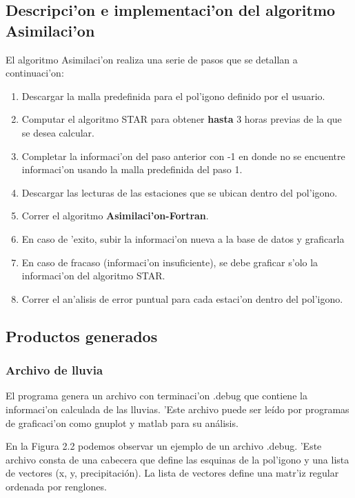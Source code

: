 \subsection{Descripci'on e implementaci'on del algoritmo Asimilaci'on}
El algoritmo Asimilaci'on realiza una serie de pasos que se detallan a continuaci'on:
\begin{enumerate}
 \item Descargar la malla predefinida para el pol'igono definido por el usuario.
  \item Computar el algoritmo STAR para obtener \textbf{hasta} 3 horas previas de la que se desea calcular.
  \item Completar la informaci'on del paso anterior con -1 en donde no se encuentre informaci'on usando la malla predefinida del paso 1.
  \item Descargar las lecturas de las estaciones que se ubican dentro del pol'igono.
  \item Correr el algoritmo \textbf{Asimilaci'on-Fortran}.
  \item En caso de 'exito, subir la informaci'on nueva a la base de datos y graficarla
  \item En caso de fracaso (informaci'on insuficiente), se debe graficar s'olo la informaci'on del algoritmo STAR.
  \item Correr el an'alisis de error puntual para cada estaci'on dentro del pol'igono.
\end{enumerate}

\subsection{Productos generados}
\subsubsection*{Archivo de lluvia}
El programa genera un archivo con terminaci'on .debug que contiene la informaci'on calculada de las lluvias.
'Este archivo puede ser leído por programas de graficaci'on como gnuplot y matlab para su análisis.

En la Figura 2.2 podemos observar un ejemplo de un archivo .debug. 'Este archivo
consta de una cabecera que define las esquinas de la pol'igono y una lista de vectores (x, y, precipitación). La
lista de vectores define una matr'iz regular ordenada por renglones.


